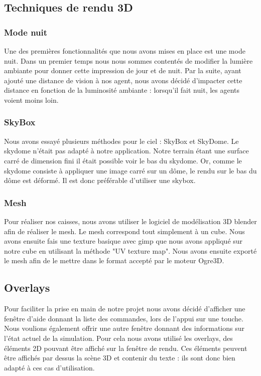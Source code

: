 \subsection{Techniques de rendu 3D}

\subsubsection{Mode nuit}
Une des premières fonctionnalités que nous avons mises en place est une mode
nuit. Dans un premier temps nous nous sommes contentés de modifier la lumière
ambiante pour donner cette impression de jour et de nuit. Par la suite, ayant
ajouté une distance de vision à nos agent, nous avons décidé d'impacter cette
distance en fonction de la luminosité ambiante : lorsqu'il fait nuit, les
agents voient moins loin.

\subsubsection{SkyBox}
Nous avons essayé plusieurs méthodes pour le ciel : SkyBox et SkyDome. Le
skydome n'était pas adapté à notre application. Notre terrain étant une
surface carré de dimension fini il était possible voir le bas du skydome.
Or, comme le skydome consiste à appliquer une image carré sur un dôme, le
rendu sur le bas du dôme est déformé. Il est donc préférable d'utiliser une
skybox.

\subsubsection{Mesh}
Pour réaliser nos caisses, nous avons utiliser le logiciel de modélisation 3D
blender afin de réaliser le mesh. Le mesh correspond tout simplement à un
cube. Nous avons ensuite fais une texture basique avec gimp que nous avons
appliqué sur notre cube en utilisant la méthode "UV texture map".
Nous avons ensuite exporté le mesh afin de le mettre dans le format
accepté par le moteur Ogre3D.



\subsection{Overlays}
Pour faciliter la prise en main de notre projet nous avons décidé d'afficher
une fenêtre d'aide donnant la liste des commandes, lors de l'appui sur une
touche. Nous voulions également offrir une autre fenêtre donnant des
informations sur l'état actuel de la simulation.
Pour cela nous avons utilisé les overlays, des éléments 2D pouvant être
affiché sur la fenêtre de rendu. Ces éléments peuvent être affichés par dessus
la scène 3D et contenir du texte : ils sont donc bien adapté à ces cas
d'utilisation.

